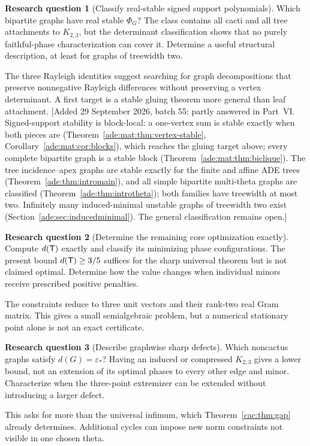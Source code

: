 \documentclass[11pt]{article}
\numberwithin{equation}{section}
\theoremstyle{definition}
\newtheorem{question}{Research question}%
\newcommand{\epsstar}{\varepsilon_*}
\begin{document}
\begin{question}[Classify real-stable signed support polynomials]\label{ade:hq:classify}%
Which bipartite graphs have real stable $\Phi_G$? The class contains all cacti and all tree attachments to $K_{2,3}$, but the determinant classification shows that no purely faithful-phase characterization can cover it. Determine a useful structural description, at least for graphs of treewidth two.
\end{question}
The three Rayleigh identities suggest searching for graph decompositions that preserve nonnegative Rayleigh differences without preserving a vertex determinant. A first target is a stable gluing theorem more general than leaf attachment.
[Added 29 September 2026, batch 55: partly answered in Part~VI. Signed-support stability is block-local: a one-vertex sum is stable exactly when both pieces are (Theorem~\ref{ade:mat:thm:vertex-stable}, Corollary~\ref{ade:mat:cor:blocks}), which reaches the gluing target above; every complete bipartite graph is a stable block (Theorem~\ref{ade:mat:thm:biclique}). The tree incidence--apex graphs are stable exactly for the finite and affine ADE trees (Theorem~\ref{ade:thm:intromain}), and all simple bipartite multi-theta graphs are classified (Theorem~\ref{ade:thm:introtheta}); both families have treewidth at most two. Infinitely many induced-minimal unstable graphs of treewidth two exist (Section~\ref{ade:sec:inducedminimal}). The general classification remains open.]

\begin{question}[Determine the remaining core optimization exactly]
Compute $d(\mathsf T)$ exactly and classify its minimizing phase configurations. The present bound $d(\mathsf T)\ge3/5$ suffices for the sharp universal theorem but is not claimed optimal. Determine how the value changes when individual minors receive prescribed positive penalties.
\end{question}
The constraints reduce to three unit vectors and their rank-two real Gram matrix. This gives a small semialgebraic problem, but a numerical stationary point alone is not an exact certificate.

\begin{question}[Describe graphwise sharp defects]
Which noncactus graphs satisfy $d(G)=\epsstar$? Having an induced or compressed $K_{2,3}$ gives a lower bound, not an extension of its optimal phases to every other edge and minor. Characterize when the three-point extremizer can be extended without introducing a larger defect.
\end{question}
This asks for more than the universal infimum, which Theorem~\ref{cac:thm:gap} already determines. Additional cycles can impose new norm constraints not visible in one chosen theta.
\end{document}
